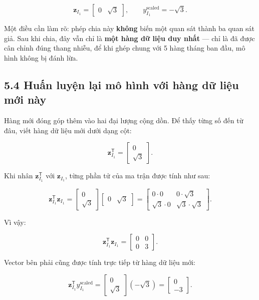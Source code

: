 \documentclass[12pt]{article}
\begin{document}
\[
\boldsymbol{z}_{I_1}
=
\begin{bmatrix}
0 & \sqrt{3}
\end{bmatrix},
\qquad
y_{I_1}^{\mathrm{scaled}}
=
-\sqrt{3}.
\]

Một điều cần làm rõ: phép chia này \textbf{không} biến một quan sát thành ba quan sát giả. Sau khi chia, đây vẫn chỉ là \textbf{một hàng dữ liệu duy nhất} — chỉ là đã được cân chỉnh đúng thang nhiễu, để khi ghép chung với 5 hàng tháng ban đầu, mô hình không bị đánh lừa.

\subsection{5.4 Huấn luyện lại mô hình với hàng dữ liệu mới này}

Hàng mới đóng góp thêm vào hai đại lượng cộng dồn. Để thấy từng số đến từ đâu, viết hàng dữ liệu mới dưới dạng cột:

\[
\boldsymbol{z}_{I_1}^{\mathsf{T}}
=
\begin{bmatrix}
0\\
\sqrt{3}
\end{bmatrix}.
\]

Khi nhân $\boldsymbol{z}_{I_1}^{\mathsf{T}}$ với $\boldsymbol{z}_{I_1}$, từng phần tử của ma trận được tính như sau:

\[
\boldsymbol{z}_{I_1}^{\mathsf{T}}
\boldsymbol{z}_{I_1}
=
\begin{bmatrix}
0\\
\sqrt{3}
\end{bmatrix}
\begin{bmatrix}
0 & \sqrt{3}
\end{bmatrix}
=
\begin{bmatrix}
0\cdot0 & 0\cdot\sqrt{3}\\
\sqrt{3}\cdot0 & \sqrt{3}\cdot\sqrt{3}
\end{bmatrix}.
\]

Vì vậy:

\[
\boldsymbol{z}_{I_1}^{\mathsf{T}}
\boldsymbol{z}_{I_1}
=
\begin{bmatrix}
0 & 0\\
0 & 3
\end{bmatrix}.
\]

Vector bên phải cũng được tính trực tiếp từ hàng dữ liệu mới:

\[
\boldsymbol{z}_{I_1}^{\mathsf{T}}
y_{I_1}^{\mathrm{scaled}}
=
\begin{bmatrix}
0\\
\sqrt{3}
\end{bmatrix}
(-\sqrt{3})
=
\begin{bmatrix}
0\\
-3
\end{bmatrix}.
\]
\end{document}
